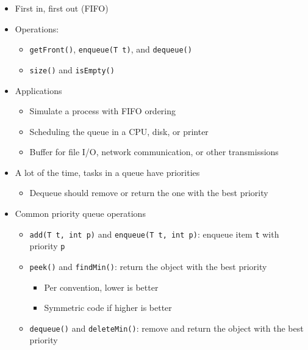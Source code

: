 \documentclass[
  10pt,
  english,
  letterpaper,
,tablecaptionabove
]{scrartcl}
\newcommand{\passthrough}[1]{#1}
\providecommand{\tightlist}{%
  \setlength{\itemsep}{0pt}\setlength{\parskip}{0pt}}
\begin{document}
\begin{itemize}
\tightlist
\item
  First in, first out (FIFO)
\item
  Operations:

  \begin{itemize}
  \tightlist
  \item
    \passthrough{\lstinline!getFront()!},
    \passthrough{\lstinline!enqueue(T t)!}, and
    \passthrough{\lstinline!dequeue()!}
  \item
    \passthrough{\lstinline!size()!} and
    \passthrough{\lstinline!isEmpty()!}
  \end{itemize}
\item
  Applications

  \begin{itemize}
  \tightlist
  \item
    Simulate a process with FIFO ordering
  \item
    Scheduling the queue in a CPU, disk, or printer
  \item
    Buffer for file I/O, network communication, or other transmissions
  \end{itemize}
\item
  A lot of the time, tasks in a queue have priorities

  \begin{itemize}
  \tightlist
  \item
    Dequeue should remove or return the one with the best priority
  \end{itemize}
\item
  Common priority queue operations

  \begin{itemize}
  \tightlist
  \item
    \passthrough{\lstinline!add(T t, int p)!} and
    \passthrough{\lstinline!enqueue(T t, int p)!}: enqueue item
    \passthrough{\lstinline!t!} with priority
    \passthrough{\lstinline!p!}
  \item
    \passthrough{\lstinline!peek()!} and
    \passthrough{\lstinline!findMin()!}: return the object with the best
    priority

    \begin{itemize}
    \tightlist
    \item
      Per convention, lower is better
    \item
      Symmetric code if higher is better
    \end{itemize}
  \item
    \passthrough{\lstinline!dequeue()!} and
    \passthrough{\lstinline!deleteMin()!}: remove and return the object
    with the best priority
  \end{itemize}
\end{itemize}
\end{document}
